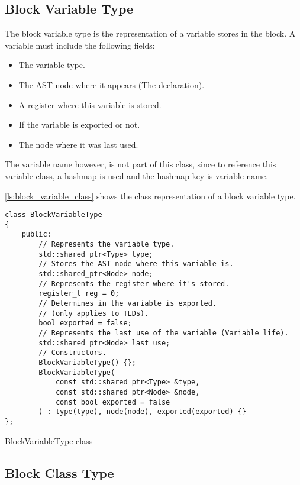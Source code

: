 \subsection{Block Variable Type}

The block variable type is the representation of a variable stores in the block. A variable must include the following fields:

\begin{itemize}
    \item The variable type.
    \item The AST node where it appears (The declaration).
    \item A register where this variable is stored.
    \item If the variable is exported or not.
    \item The node where it was last used.
\end{itemize}

The variable name however, is not part of this class, since to reference this variable class, a hashmap is used and the hashmap key is variable name.

\autoref{ls:block_variable_class} shows the class representation of a block variable type.

\begin{listing}[H]
\begin{verbatim}
class BlockVariableType
{
    public:
        // Represents the variable type.
        std::shared_ptr<Type> type;
        // Stores the AST node where this variable is.
        std::shared_ptr<Node> node;
        // Represents the register where it's stored.
        register_t reg = 0;
        // Determines in the variable is exported.
        // (only applies to TLDs).
        bool exported = false;
        // Represents the last use of the variable (Variable life).
        std::shared_ptr<Node> last_use;
        // Constructors.
        BlockVariableType() {};
        BlockVariableType(
            const std::shared_ptr<Type> &type,
            const std::shared_ptr<Node> &node,
            const bool exported = false
        ) : type(type), node(node), exported(exported) {}
};
\end{verbatim}
\caption{BlockVariableType class}
\label{ls:block_variable_class}
\end{listing}

\subsection{Block Class Type}

